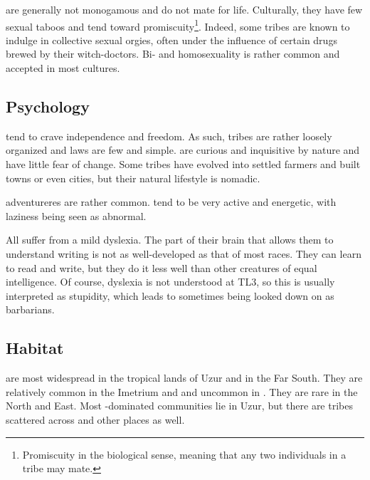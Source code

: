 \Meccara{} are generally not monogamous and do not mate for life. Culturally, they have few sexual taboos and tend toward promiscuity\footnote{Promiscuity in the biological sense, meaning that any two individuals in a tribe may mate.}. Indeed, some tribes are known to indulge in collective sexual orgies, often under the influence of certain drugs brewed by their witch-doctors. Bi- and homosexuality is rather common and accepted in most cultures. 









\subsection{Psychology}
\Meccara{} tend to crave independence and freedom. As such, \meccaran{} tribes are rather loosely organized and laws are few and simple. \Meccara{} are curious and inquisitive by nature and have little fear of change. Some tribes have evolved into settled farmers and built towns or even cities, but their natural lifestyle is nomadic. 

\Meccaran{} adventureres are rather common. \Meccara{} tend to be very active and energetic, with laziness being seen as abnormal. 

All \meccara{} suffer from a mild dyslexia. The part of their brain that allows them to understand writing is not as well-developed as that of most races. They can learn to read and write, but they do it less well than other creatures of equal intelligence. Of course, dyslexia is not understood at TL3, so this is usually interpreted as stupidity, which leads to \meccarans{} sometimes being looked down on as barbarians. 









\subsection{Habitat}
\Meccara{} are most widespread in the tropical lands of Uzur and in the Far South. They are relatively common in the Imetrium and \Durcac and uncommon in \Velcad{}. They are rare in the North and East. Most \meccara{}-dominated communities lie in Uzur, but there are \meccaran{} tribes scattered across \Velcad{} and other places as well. 















